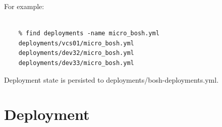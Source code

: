 For example:

\begin{adjustwidth}{2.5em}{2.5em}
\begin{verbatim}

    % find deployments -name micro_bosh.yml
    deployments/vcs01/micro_bosh.yml
    deployments/dev32/micro_bosh.yml
    deployments/dev33/micro_bosh.yml

\end{verbatim}
\end{adjustwidth}

Deployment state is persisted to deployments\slash bosh-deployments.yml.

\section{Deployment}
\label{deployment}

